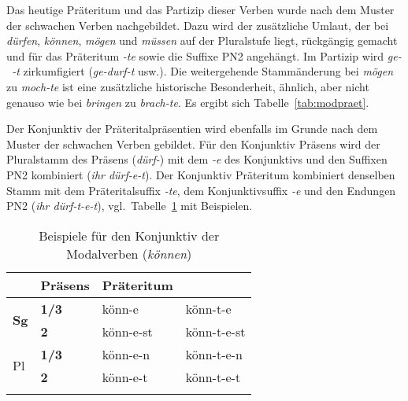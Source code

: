 Das heutige Präteritum und das Partizip dieser Verben wurde nach dem Muster der schwachen Verben nachgebildet.
Dazu wird der zusätzliche Umlaut, der bei \textit{dürfen}, \textit{können}, \textit{mögen} und \textit{müssen} auf der Pluralstufe liegt, rückgängig gemacht und für das Präteritum \textit{-te} sowie die Suffixe PN2 angehängt.
Im Partizip wird \textit{ge-~-t} zirkumfigiert (\textit{ge-durf-t} usw.).
Die weitergehende Stammänderung bei \textit{mögen} zu \textit{moch-te} ist eine zusätzliche historische Besonderheit, ähnlich, aber nicht genauso wie bei \textit{bringen} zu \textit{brach-te}.
Es ergibt sich Tabelle~\ref{tab:modpraet}.

\begin{table}
  \caption{Präteritum der Modalverben}
  \label{tab:modpraet}
\end{table}

Der Konjunktiv der Präteritalpräsentien wird ebenfalls im Grunde nach dem Muster der schwachen Verben gebildet.
Für den Konjunktiv Präsens wird der Pluralstamm des Präsens (\textit{dürf-}) mit dem \textit{-e} des Konjunktivs und den Suffixen PN2 kombiniert (\textit{ihr dürf-e-t}).
Der Konjunktiv Präteritum kombiniert denselben Stamm mit dem Präteritalsuffix \textit{-te}, dem Konjunktivsuffix \textit{-e} und den Endungen PN2 (\textit{ihr dürf-t-e-t}), vgl.\ Tabelle~\ref{tab:modvkonj} mit Beispielen.

\begin{table}
  \centering
  \begin{tabular}{llll}
    \lsptoprule
    \multicolumn{2}{c}{} & \textbf{Präsens} & \textbf{Präteritum} \\
    \midrule
    \multirow{2}{*}{\textbf{Sg}} & \textbf{1/3} & könn-e & könn-t-e \\
    & \textbf{2} & könn-e-st & könn-t-e-st \\
    \midrule
    \multirow{2}{*}{Pl} & \textbf{1/3} & könn-e-n & könn-t-e-n \\
    & \textbf{2} & könn-e-t & könn-t-e-t \\
    \lspbottomrule
  \end{tabular}
  \caption{Beispiele für den Konjunktiv der Modalverben (\textit{können})}
  \label{tab:modvkonj}
\end{table}


